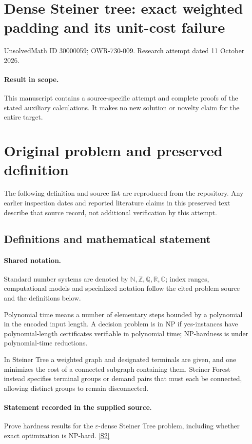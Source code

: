 \documentclass[11pt]{article}
\begin{document}
\section*{Dense Steiner tree: exact weighted padding and its unit-cost failure}
\noindent UnsolvedMath ID 30000059; OWR-730-009. Research attempt dated 11 October 2026.
\paragraph{Result in scope.}This manuscript contains a source-specific attempt and complete proofs of the stated auxiliary calculations. It makes no new solution or novelty claim for the entire target.
\section{Original problem and preserved definition}
The following definition and source list are reproduced from the repository. Any earlier inspection dates and reported literature claims in this preserved text describe that source record, not additional verification by this attempt.
\subsection{Definitions and mathematical statement}

\paragraph{Shared notation.}Standard number systems are denoted by $\mathbb N,\mathbb Z,\mathbb Q,\mathbb R,\mathbb C$; index ranges, computational models and specialized notation follow the cited problem source and the definitions below.


Polynomial time means a number of elementary steps bounded by a polynomial in the encoded input length. A decision problem is in $\mathrm{NP}$ if yes-instances have polynomial-length certificates verifiable in polynomial time; NP-hardness is under polynomial-time reductions.

In Steiner Tree a weighted graph and designated terminals are given, and one minimizes the cost of a connected subgraph containing them. Steiner Forest instead specifies terminal groups or demand pairs that must each be connected, allowing distinct groups to remain disconnected.
\paragraph{Statement recorded in the supplied source.}
Prove hardness results for the $\varepsilon$-dense Steiner Tree problem, including whether exact optimization is NP-hard. \href{https://doi.org/10.4171/owr/2004/28}{[S2]}
\end{document}
